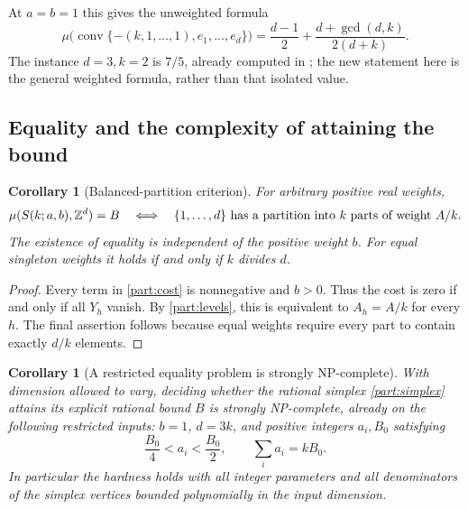 \documentclass[11pt,a4paper]{article}
\newtheorem{corollary}[theorem]{Corollary}
\theoremstyle{remark}\newtheorem{remark}[theorem]{Remark}
\DeclareMathOperator{\conv}{conv}
\begin{document}
At $a=b=1$ this gives the unweighted formula
\begin{equation}\label{part:unweighted}
 \mu\bigl(\conv\{-(k,1,\ldots,1),e_1,\ldots,e_d\}\bigr)
 =\frac{d-1}{2}+\frac{d+\gcd(d,k)}{2(d+k)}.
\end{equation}
The instance $d=3,k=2$ is $7/5$, already computed in
\cite[Corollary B.4]{CSS}; the new statement here is the general
weighted formula, rather than that isolated value.

\subsection{Equality and the complexity of attaining the bound}

\begin{corollary}[Balanced-partition criterion]\label{part:balanced}
For arbitrary positive real weights,
\begin{equation}\label{part:balancedeq}
 \mu(S(k;a,b),\mathbb Z^d)=B
 \quad\Longleftrightarrow\quad
 \{1,\ldots,d\}\text{ has a partition into $k$ parts of weight }A/k.
\end{equation}
The existence of equality is independent of the positive weight $b$.
For equal singleton weights it holds if and only if $k$ divides $d$.
\end{corollary}

\begin{proof}
Every term in \eqref{part:cost} is nonnegative and $b>0$.
Thus the cost is zero if and only if all $Y_h$ vanish.  By
\eqref{part:levels}, this is equivalent to $A_h=A/k$ for every $h$.
The final assertion follows because equal weights require every
part to contain exactly $d/k$ elements.
\end{proof}

\begin{corollary}[A restricted equality problem is strongly NP-complete]
\label{part:complexity}
With dimension allowed to vary, deciding whether the rational
simplex \eqref{part:simplex} attains its explicit rational bound
$B$ is strongly NP-complete, already on the following restricted
inputs: $b=1$, $d=3k$, and positive integers $a_i,B_0$ satisfying
\[
 \frac{B_0}{4}<a_i<\frac{B_0}{2},\qquad
 \sum_i a_i=kB_0.
\]
In particular the hardness holds with all integer parameters and
all denominators of the simplex vertices bounded polynomially in
the input dimension.
\end{corollary}
\end{document}

